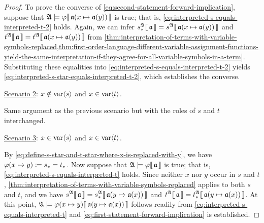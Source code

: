 \begin{proof}
    \vspace{0.3cm}
    \noindent
    To prove the converse of \eqref{eq:second-statement-forward-implication}, suppose that
    \( \folwffsatisfaction{\mathfrak{A}}{\varphi}{ \folmodifiedvariableassignmentfunction{\mathfrak{a}}{x}{\mathfrak{a}(y)} } \) is true;
    that is, \eqref{eq:interpreted-s-equals-interpreted-t-2} holds.
    Again, we can infer \( \folterminterpretation{s_{\ast}}{\mathfrak{A}}{\mathfrak{a}} = \folterminterpretation{s}{\mathfrak{A}}{ \folmodifiedvariableassignmentfunction{\mathfrak{a}}{x}{\mathfrak{a}(y)} } \) and \( \folterminterpretation{t}{\mathfrak{A}}{\mathfrak{a}} = \folterminterpretation{t}{\mathfrak{A}}{ \folmodifiedvariableassignmentfunction{\mathfrak{a}}{x}{\mathfrak{a}(y)} } \) from
    \cref{thm:interpretation-of-terms-with-variable-symbols-replaced,thm:first-order-language-different-variable-assignment-functions-yield-the-same-interpretation-if-they-agree-for-all-variable-symbols-in-a-term}.
    Substituting these equalities into \eqref{eq:interpreted-s-equals-interpreted-t-2} yields \eqref{eq:interpreted-s-star-equals-interpreted-t-2}, which establishes
    the converse.

    \vspace{0.3cm}
    \noindent
    \underline{Scenario 2}: \( x \notin \operatorname{var} \langle s\rangle \) and \( x \in \operatorname{var} \langle t\rangle \).

    \vspace{0.1cm}
    \noindent
    Same argument as the previous scenario but with the roles of \( s \) and \( t \) interchanged.

    \vspace{0.3cm}
    \noindent
    \underline{Scenario 3}: \( x \in \operatorname{var} \langle s\rangle \) and \( x \in \operatorname{var} \langle t\rangle \).

    \vspace{0.1cm}
    \noindent
    By \eqref{eq:define-s-star-and-t-star-where-x-is-replaced-with-y}, we have \( \folfreevariablereplacement{\varphi}{x}{y} \coloneq s_{\ast} = t_{\ast} \).
    Now suppose that \(  \mathfrak{A} \models \varphi\llbracket\, \mathfrak{a} \,\rrbracket \) is true;
    that is, \eqref{eq:interpreted-s-equals-interpreted-t} holds.
    Since neither \( x \) nor \( y \) occur in \( s \) and \( t \),
    \cref{thm:interpretation-of-terms-with-variable-symbols-replaced} applies to both \( s \) and \( t \), and we have
    \( \folterminterpretation{s}{\mathfrak{A}}{\mathfrak{a}} = \folterminterpretation{s_{\ast}}{\mathfrak{A}}{ \folmodifiedvariableassignmentfunction{\mathfrak{a}}{y}{\mathfrak{a}(x)} } \) and
    \( \folterminterpretation{t}{\mathfrak{A}}{\mathfrak{a}} = \folterminterpretation{t_{\ast}}{\mathfrak{A}}{ \folmodifiedvariableassignmentfunction{\mathfrak{a}}{y}{\mathfrak{a}(x)} } \).
    At this point, \( \folwffsatisfaction{\mathfrak{A}}{ \folfreevariablereplacement{\varphi}{x}{y} }{ \folmodifiedvariableassignmentfunction{\mathfrak{a}}{y}{\mathfrak{a}(x)} }\)
    follows readily from \eqref{eq:interpreted-s-equals-interpreted-t} and
    \eqref{eq:first-statement-forward-implication} is established.


\end{proof}
